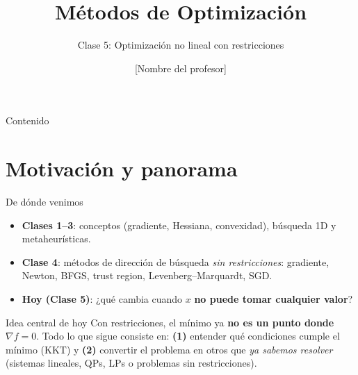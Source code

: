\documentclass[aspectratio=169]{beamer}
\title{Métodos de Optimización}
\subtitle{Clase 5: Optimización no lineal con restricciones}
\author{[Nombre del profesor]}
\institute{[Nombre de la universidad / programa]}
\date{}
\newcommand{\grad}{\nabla}
\begin{document}
\maketitle

\begin{frame}{Contenido}
  \tableofcontents
\end{frame}

\section{Motivación y panorama}

\begin{frame}{De dónde venimos}
  \begin{itemize}
    \item \textbf{Clases 1--3}: conceptos (gradiente, Hessiana, convexidad), búsqueda 1D y metaheurísticas.
    \item \textbf{Clase 4}: métodos de dirección de búsqueda \emph{sin restricciones}: gradiente, Newton, BFGS, trust region, Levenberg--Marquardt, SGD.
    \item \textbf{Hoy (Clase 5)}: ¿qué cambia cuando $x$ \textbf{no puede tomar cualquier valor}?
  \end{itemize}
  \begin{alertblock}{Idea central de hoy}
    Con restricciones, el mínimo ya \textbf{no es un punto donde $\grad f=0$}. Todo lo que sigue consiste en: \textbf{(1)} entender qué condiciones cumple el mínimo (KKT) y \textbf{(2)} convertir el problema en otros que \emph{ya sabemos resolver} (sistemas lineales, QPs, LPs o problemas sin restricciones).
  \end{alertblock}
\end{frame}
\end{document}
